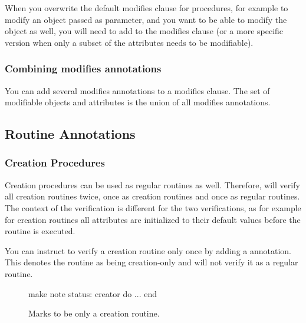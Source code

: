 When you overwrite the default modifies clause for procedures, for example to modify an object passed as parameter, and you want to be able to modify the  object as well, you will need to add  to the modifies clause (or a more specific version when only a subset of the attributes needs to be modifiable).

\subsubsection*{Combining modifies annotations}

You can add several modifies annotations to a modifies clause. The set of modifiable objects and attributes is the union of all modifies annotations.

\subsection{Routine Annotations}

\subsubsection*{Creation Procedures} \label{sec:creator}

Creation procedures can be used as regular routines as well. Therefore, \AutoProof will verify all creation routines twice, once as creation routines and once as regular routines. The context of the verification is different for the two verifications, as for example for creation routines all attributes are initialized to their default values before the routine is executed.

You can instruct \AutoProof to verify a creation routine only once by adding a  annotation. This denotes the routine as being creation-only and \AutoProof will not verify it as a regular routine.

\begin{figure}
\begin{erunning}
make
	note
		status: creator
	do ... end
\end{erunning}
\hspace{0.5cm}
\caption*{Marks  to be only a creation routine.}
\end{figure}

